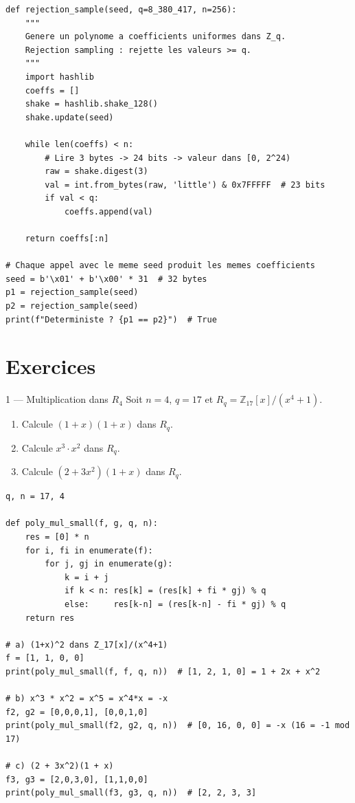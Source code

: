 \documentclass[12pt, a4paper]{article}
\begin{document}
\begin{lstlisting}[style=python]
def rejection_sample(seed, q=8_380_417, n=256):
    """
    Genere un polynome a coefficients uniformes dans Z_q.
    Rejection sampling : rejette les valeurs >= q.
    """
    import hashlib
    coeffs = []
    shake = hashlib.shake_128()
    shake.update(seed)

    while len(coeffs) < n:
        # Lire 3 bytes -> 24 bits -> valeur dans [0, 2^24)
        raw = shake.digest(3)
        val = int.from_bytes(raw, 'little') & 0x7FFFFF  # 23 bits
        if val < q:
            coeffs.append(val)

    return coeffs[:n]

# Chaque appel avec le meme seed produit les memes coefficients
seed = b'\x01' + b'\x00' * 31  # 32 bytes
p1 = rejection_sample(seed)
p2 = rejection_sample(seed)
print(f"Deterministe ? {p1 == p2}")  # True
\end{lstlisting}

\section{Exercices}

\begin{exercice}{1 --- Multiplication dans $R_4$}
Soit $n = 4$, $q = 17$ et $R_q = \mathbb{Z}_{17}[x]/(x^4 + 1)$.
\begin{enumerate}[label=\alph*)]
  \item Calcule $(1 + x)(1 + x)$ dans $R_q$.
  \item Calcule $x^3 \cdot x^2$ dans $R_q$.
  \item Calcule $(2 + 3x^2)(1 + x)$ dans $R_q$.
\end{enumerate}
\end{exercice}

\begin{solution}
\begin{lstlisting}[style=python]
q, n = 17, 4

def poly_mul_small(f, g, q, n):
    res = [0] * n
    for i, fi in enumerate(f):
        for j, gj in enumerate(g):
            k = i + j
            if k < n: res[k] = (res[k] + fi * gj) % q
            else:     res[k-n] = (res[k-n] - fi * gj) % q
    return res

# a) (1+x)^2 dans Z_17[x]/(x^4+1)
f = [1, 1, 0, 0]
print(poly_mul_small(f, f, q, n))  # [1, 2, 1, 0] = 1 + 2x + x^2

# b) x^3 * x^2 = x^5 = x^4*x = -x
f2, g2 = [0,0,0,1], [0,0,1,0]
print(poly_mul_small(f2, g2, q, n))  # [0, 16, 0, 0] = -x (16 = -1 mod 17)

# c) (2 + 3x^2)(1 + x)
f3, g3 = [2,0,3,0], [1,1,0,0]
print(poly_mul_small(f3, g3, q, n))  # [2, 2, 3, 3]
\end{lstlisting}
\end{solution}
\end{document}
